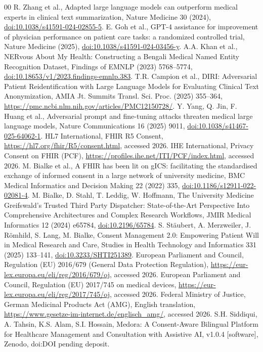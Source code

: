 \documentclass[preprint,12pt,a4paper]{elsarticle}
\newcommand{\ReleaseVersion}{v1.0.4}
\newcommand{\ReleaseDOI}{DOI pending deposit}
\begin{document}
\begin{thebibliography}{00}
 R. Zhang et al., Adapted large language models can outperform medical experts in clinical text summarization, Nature Medicine 30 (2024), \href{https://doi.org/10.1038/s41591-024-02855-5}{doi:10.1038/s41591-024-02855-5}.
 E. Goh et al., GPT-4 assistance for improvement of physician performance on patient care tasks: a randomized controlled trial, Nature Medicine (2025), \href{https://doi.org/10.1038/s41591-024-03456-y}{doi:10.1038/s41591-024-03456-y}.
 A.A. Khan et al., NERvous About My Health: Constructing a Bengali Medical Named Entity Recognition Dataset, Findings of EMNLP (2023) 5768--5774, \href{https://doi.org/10.18653/v1/2023.findings-emnlp.383}{doi:10.18653/v1/2023.findings-emnlp.383}.
 T.R. Campion et al., DIRI: Adversarial Patient Reidentification with Large Language Models for Evaluating Clinical Text Anonymization, AMIA Jt. Summits Transl. Sci. Proc. (2025) 355--364, \url{https://pmc.ncbi.nlm.nih.gov/articles/PMC12150728/}.
 Y. Yang, Q. Jin, F. Huang et al., Adversarial prompt and fine-tuning attacks threaten medical large language models, Nature Communications 16 (2025) 9011, \href{https://doi.org/10.1038/s41467-025-64062-1}{doi:10.1038/s41467-025-64062-1}.
 HL7 International, FHIR R5 Consent, \url{https://hl7.org/fhir/R5/consent.html}, accessed 2026.
 IHE International, Privacy Consent on FHIR (PCF), \url{https://profiles.ihe.net/ITI/PCF/index.html}, accessed 2026.
 M. Bialke et al., A FHIR has been lit on gICS: facilitating the standardised exchange of informed consent in a large network of university medicine, BMC Medical Informatics and Decision Making 22 (2022) 335, \href{https://doi.org/10.1186/s12911-022-02081-4}{doi:10.1186/s12911-022-02081-4}.
 M. Bialke, D. Stahl, T. Leddig, W. Hoffmann, The University Medicine Greifswald's Trusted Third Party Dispatcher: State-of-the-Art Perspective Into Comprehensive Architectures and Complex Research Workflows, JMIR Medical Informatics 12 (2024) e65784, \href{https://doi.org/10.2196/65784}{doi:10.2196/65784}.
 S. St\"aubert, A. Merzweiler, J. R\"omhild, S. Lang, M. Bialke, Consent Management 2.0: Empowering Patient Will in Medical Research and Care, Studies in Health Technology and Informatics 331 (2025) 133--141, \href{https://doi.org/10.3233/SHTI251389}{doi:10.3233/SHTI251389}.
 European Parliament and Council, Regulation (EU) 2016/679 (General Data Protection Regulation), \url{https://eur-lex.europa.eu/eli/reg/2016/679/oj}, accessed 2026.
 European Parliament and Council, Regulation (EU) 2017/745 on medical devices, \url{https://eur-lex.europa.eu/eli/reg/2017/745/oj}, accessed 2026.
 Federal Ministry of Justice, German Medicinal Products Act (AMG), English translation, \url{https://www.gesetze-im-internet.de/englisch_amg/}, accessed 2026.
 S.H. Siddiqui, A. Tahsin, K.S. Alam, S.I. Hossain, Medora: A Consent-Aware Bilingual Platform for Healthcare Management and Consultation with Assistive AI, \ReleaseVersion{} [software], Zenodo, doi:\ReleaseDOI.

\end{thebibliography}
\end{document}
